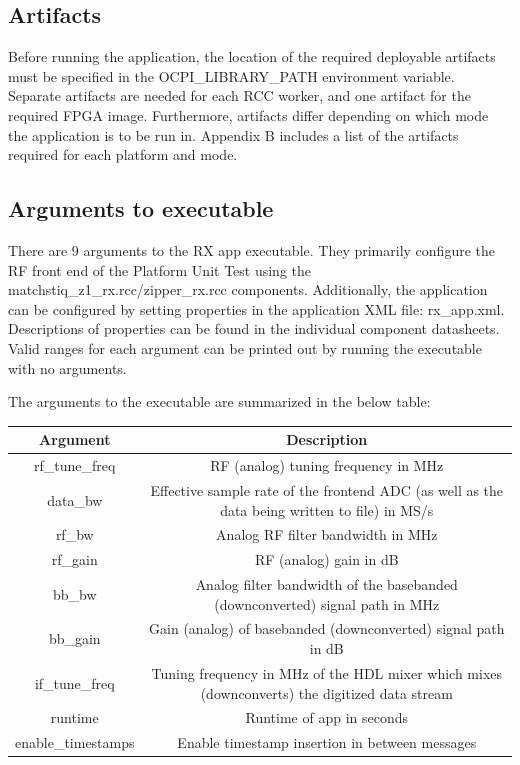 \documentclass{article}
\begin{document}
\subsection{Artifacts}
\noindent Before running the application, the location of the required deployable artifacts must be specified in the OCPI\_LIBRARY\_PATH environment variable. Separate artifacts are needed for each RCC worker, and one artifact for the required FPGA image. Furthermore, artifacts differ depending on which mode the application is to be run in. Appendix B includes a list of the artifacts required for each platform and mode.
\subsection{Arguments to executable}
\noindent There are 9 arguments to the RX app executable. They primarily configure the RF front end of the Platform Unit Test using the matchstiq\_z1\_rx.rcc/zipper\_rx.rcc components. Additionally, the application can be configured by setting properties in the application XML file: rx\_app.xml. Descriptions of properties can be found in the individual component datasheets. Valid ranges for each argument can be printed out by running the executable with no arguments.\par\medskip
\noindent The arguments to the executable are summarized in the below table:
	\begin{center}
	\begin{tabularx}{\textwidth}{|c|C|}
	\hline
	Argument & Description\\
	\hline
	rf\_tune\_freq & RF (analog) tuning frequency in MHz\\
	\hline
	data\_bw & Effective sample rate of the frontend ADC (as well as the data being written to file) in MS/s\\
	\hline
	rf\_bw & Analog RF filter bandwidth in MHz\\
	\hline
	rf\_gain & RF (analog) gain in dB\\
	\hline
	bb\_bw & Analog filter bandwidth of the basebanded (downconverted) signal path in MHz\\
	\hline
	bb\_gain & Gain (analog) of basebanded (downconverted) signal path in dB\\
	\hline
	if\_tune\_freq & Tuning frequency in MHz of the HDL mixer which mixes (downconverts) the digitized data stream\\
	\hline
	runtime & Runtime of app in seconds\\
	\hline
	enable\_timestamps & Enable timestamp insertion in between messages\\
	\hline
	\end{tabularx}
	\end{center}
\end{document}
